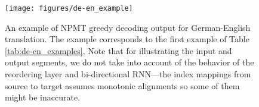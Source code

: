 \documentclass{article}
\begin{document}
\begin{figure}[t!]
	\begin{center}
		\centerline{\texttt{[image: figures/de-en\_example]}}
		\vskip -0.1in
		\caption{\small{An example of NPMT greedy decoding output for German-English
				translation. The example corresponds to the first example of Table
				\ref{tab:de-en_examples}. Note that for illustrating the input and output
				segments, we do not take into account of the behavior of the reordering
				layer and bi-directional RNN---the index mappings from source to target
				assumes monotonic alignments so some of them might be inaccurate.}}
		\label{fig:de-en_examples}
	\end{center}
	
\end{figure} 
\end{document}

